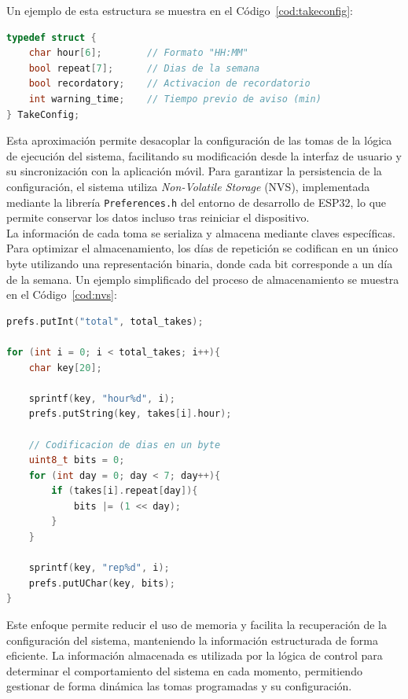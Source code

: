 Un ejemplo de esta estructura se muestra en el Código~\ref{cod:takeconfig}:

\begin{code}[H]
\begin{lstlisting}[language=C++]
typedef struct {
    char hour[6];        // Formato "HH:MM"
    bool repeat[7];      // Dias de la semana
    bool recordatory;    // Activacion de recordatorio
    int warning_time;    // Tiempo previo de aviso (min)
} TakeConfig;
\end{lstlisting}
\caption{Estructura de datos para la configuración de tomas}
\label{cod:takeconfig}
\end{code}

Esta aproximación permite desacoplar la configuración de las tomas de la lógica de ejecución del sistema, facilitando su modificación desde la interfaz de usuario y su sincronización con la aplicación móvil. Para garantizar la persistencia de la configuración, el sistema utiliza \textit{Non-Volatile Storage} (NVS), implementada mediante la librería \texttt{Preferences.h} del entorno de desarrollo de ESP32, lo que permite conservar los datos incluso tras reiniciar el dispositivo.\\

La información de cada toma se serializa y almacena mediante claves específicas. Para optimizar el almacenamiento, los días de repetición se codifican en un único byte utilizando una representación binaria, donde cada bit corresponde a un día de la semana. Un ejemplo simplificado del proceso de almacenamiento se muestra en el Código~\ref{cod:nvs}:

\begin{code}[H]
\begin{lstlisting}[language=C++]
prefs.putInt("total", total_takes);

for (int i = 0; i < total_takes; i++){
    char key[20];

    sprintf(key, "hour%d", i);
    prefs.putString(key, takes[i].hour);

    // Codificacion de dias en un byte
    uint8_t bits = 0;
    for (int day = 0; day < 7; day++){
        if (takes[i].repeat[day]){
            bits |= (1 << day);
        }
    }

    sprintf(key, "rep%d", i);
    prefs.putUChar(key, bits);
}
\end{lstlisting}
\caption{Almacenamiento de tomas en memoria no volátil}
\label{cod:nvs}
\end{code}

Este enfoque permite reducir el uso de memoria y facilita la recuperación de la configuración del sistema, manteniendo la información estructurada de forma eficiente. La información almacenada es utilizada por la lógica de control para determinar el comportamiento del sistema en cada momento, permitiendo gestionar de forma dinámica las tomas programadas y su configuración.

